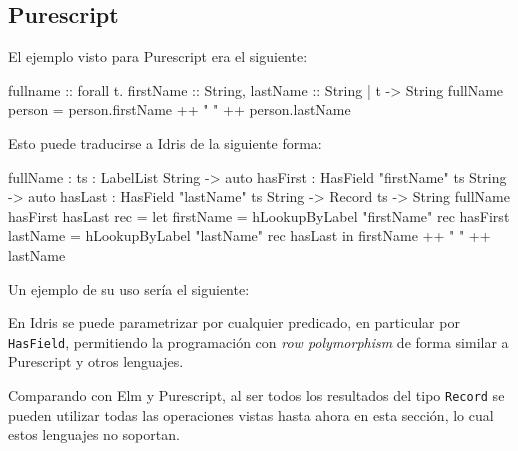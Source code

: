 \subsection{Purescript}

El ejemplo visto para Purescript era el siguiente:

\begin{code}
fullname :: forall t. { firstName :: String, 
  lastName :: String | t } -> String 
fullName person = person.firstName ++ " " ++ person.lastName
\end{code}

Esto puede traducirse a Idris de la siguiente forma:

\begin{code}
fullName : {ts : LabelList String} -> 
  {auto hasFirst : HasField "firstName" ts String} -> 
  {auto hasLast : HasField "lastName" ts String} -> 
  Record ts -> String
fullName {hasFirst} {hasLast} rec =
  let firstName = hLookupByLabel "firstName" rec hasFirst
      lastName = hLookupByLabel "lastName" rec hasLast
  in firstName ++ " " ++ lastName
\end{code}

Un ejemplo de su uso sería el siguiente:


En Idris se puede parametrizar por cualquier predicado, en particular por \texttt{HasField}, permitiendo la programación con \textit{row polymorphism} de forma similar a Purescript y otros lenguajes.

Comparando con Elm y Purescript, al ser todos los resultados del tipo \texttt{Record} se pueden utilizar todas las operaciones vistas hasta ahora en esta sección, lo cual estos lenguajes no soportan.
